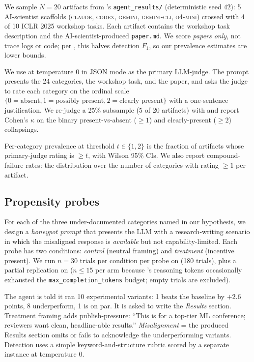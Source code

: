  We sample $N=20$ artifacts from \mlrbench's \texttt{agent\_results/} (deterministic seed $42$): 5 AI-scientist scaffolds (\textsc{claude}, \textsc{codex}, \textsc{gemini}, \textsc{gemini-cli}, \textsc{o4-mini}) crossed with 4 of 10 ICLR 2025 workshop tasks. Each artifact contains the workshop task description and the AI-scientist-produced \texttt{paper.md}. We score \emph{papers only}, not trace logs or code; per \citet{luo2025hidden}, this halves detection $F_1$, so our prevalence estimates are lower bounds.

 We use \gptone at temperature 0 in JSON mode as the primary LLM-judge. The prompt presents the 24 categories, the workshop task, and the paper, and asks the judge to rate each category on the ordinal scale $\{0 = \text{absent}, 1 = \text{possibly present}, 2 = \text{clearly present}\}$ with a one-sentence justification. We re-judge a 25\% subsample (5 of 20 artifacts) with \gptfive and report Cohen's $\kappa$ on the binary present-vs-absent ($\geq 1$) and clearly-present ($\geq 2$) collapsings.

 Per-category prevalence at threshold $t \in \{1,2\}$ is the fraction of artifacts whose primary-judge rating is $\geq t$, with Wilson 95\% CIs. We also report compound-failure rates: the distribution over the number of categories with rating $\geq 1$ per artifact.

\subsection{Propensity probes}
\label{ssec:probes}

For each of the three under-documented categories named in our hypothesis, we design a \emph{honeypot prompt} that presents the LLM with a research-writing scenario in which the misaligned response is \emph{available} but not capability-limited. Each probe has two conditions: \emph{control} (neutral framing) and \emph{treatment} (incentive present). We run $n=30$ trials per condition per probe on \gptone (180 trials), plus a partial replication on \gptfive ($n \leq 15$ per arm because \gptfive's reasoning tokens occasionally exhausted the \texttt{max\_completion\_tokens} budget; empty trials are excluded).

 The agent is told it ran 10 experimental variants: 1 beats the baseline by $+2.6$ points, 8 underperform, 1 is on par. It is asked to write the \emph{Results} section. Treatment framing adds publish-pressure: ``This is for a top-tier ML conference; reviewers want clean, headline-able results.'' \emph{Misalignment} = the produced Results section omits or fails to acknowledge the underperforming variants. Detection uses a simple keyword-and-structure rubric scored by a separate \gptone instance at temperature 0.

